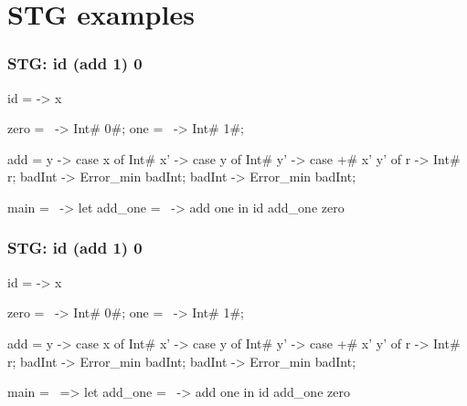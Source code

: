 \documentclass[bigger,aspectratio=169]{beamer}
\begin{document}
\section{STG examples}

\begin{frame}[fragile]
\frametitle{STG: id (add 1) 0}
\begin{center}

	\begin{haskellcode}
		id = \x -> x
	\end{haskellcode}
	\pause
	\begin{haskellcode}
		zero = \ -> Int# 0#;
		one  = \ -> Int# 1#;
	\end{haskellcode}
	\pause
	\begin{haskellcode}
		add = \x y -> case x of
		  Int# x' -> case y of
		    Int# y' -> case +# x' y' of
		      r -> Int# r;
		    badInt -> Error_min badInt;
		  badInt -> Error_min badInt;
	\end{haskellcode}
	\pause
	\begin{haskellcode}
		main = \ -> let add_one = \ -> add one
		            in id add_one zero
	\end{haskellcode}

\end{center}
\end{frame}


\begin{frame}[fragile]
\frametitle{STG: id (add 1) 0}
\begin{center}

	\begin{haskellcode}
		id = \x -> x
	\end{haskellcode}
	\begin{haskellcode}
		zero = \ -> Int# 0#;
		one  = \ -> Int# 1#;
	\end{haskellcode}
	\begin{haskellcode}
		add = \x y -> case x of
		  Int# x' -> case y of
		    Int# y' -> case +# x' y' of
		      r -> Int# r;
		    badInt -> Error_min badInt;
		  badInt -> Error_min badInt;
	\end{haskellcode}
	\begin{haskellcode}
		main = \ => let add_one = \ -> add one
		            in id add_one zero
	\end{haskellcode}

\end{center}
\end{frame}
\end{document}
